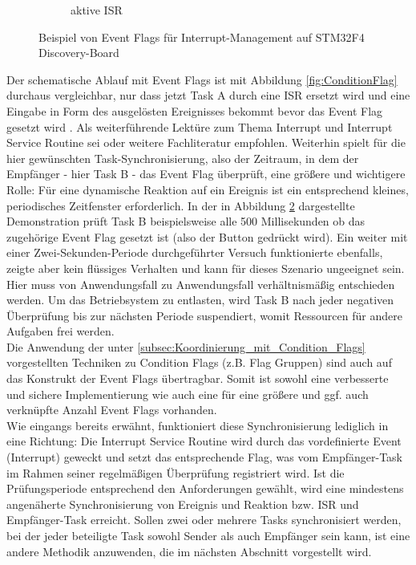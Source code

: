 \documentclass{llncs}
\begin{document}
\begin{figure}
\begin{subfigure}{.250\textwidth}
		\caption{aktive ISR}
		\label{fig:EventFlagAn}
	\end{subfigure}
	\caption{Beispiel von Event Flags für Interrupt-Management auf STM32F4 Discovery-Board}
	\label{fig:EventFlagBeispiel}
\end{figure}

Der schematische Ablauf mit Event Flags ist mit Abbildung \ref{fig:ConditionFlag} durchaus vergleichbar, nur dass jetzt Task A durch eine ISR ersetzt wird und eine Eingabe in Form des ausgelösten Ereignisses bekommt bevor das Event Flag gesetzt wird \autocite[vgl.][87]{Cooling2017}. Als weiterführende Lektüre zum Thema Interrupt und Interrupt Service Routine sei \autocite{MikrocontrollerInterrupt} oder weitere Fachliteratur empfohlen. Weiterhin spielt für die hier gewünschten Task-Synchronisierung, also der Zeitraum, in dem der Empfänger - hier Task B - das Event Flag überprüft, eine größere und wichtigere Rolle: Für eine dynamische Reaktion auf ein Ereignis ist ein entsprechend kleines, periodisches Zeitfenster erforderlich. In der in Abbildung \ref{fig:EventFlagBeispiel} dargestellte Demonstration prüft Task B beispielsweise alle 500 Millisekunden ob das zugehörige Event Flag gesetzt ist (also der Button gedrückt wird). Ein weiter mit einer Zwei-Sekunden-Periode durchgeführter Versuch funktionierte ebenfalls, zeigte aber kein flüssiges Verhalten und kann für dieses Szenario ungeeignet sein. Hier muss von Anwendungsfall zu Anwendungsfall verhältnismäßig entschieden werden. Um das Betriebsystem zu entlasten, wird Task B nach jeder negativen Überprüfung bis zur nächsten Periode suspendiert, womit Ressourcen für andere Aufgaben frei werden.\\ 

Die Anwendung der unter \ref{subsec:Koordinierung_mit_Condition_Flags} vorgestellten Techniken zu Condition Flags (z.B. Flag Gruppen) sind auch auf das Konstrukt der Event Flags übertragbar. Somit ist sowohl eine verbesserte und sichere Implementierung wie auch eine für eine größere und ggf. auch verknüpfte Anzahl Event Flags vorhanden. \autocite[vgl.][87-88]{Cooling2017}\\

Wie eingangs bereits erwähnt, funktioniert diese Synchronisierung lediglich in eine Richtung: Die Interrupt Service Routine wird durch das vordefinierte Event (Interrupt) geweckt und setzt das entsprechende Flag, was vom Empfänger-Task im Rahmen seiner regelmäßigen Überprüfung registriert wird. Ist die Prüfungsperiode entsprechend den Anforderungen gewählt, wird eine mindestens angenäherte Synchronisierung von Ereignis und Reaktion bzw. ISR und Empfänger-Task erreicht. Sollen zwei oder mehrere Tasks synchronisiert werden, bei der jeder beteiligte Task sowohl Sender als auch Empfänger sein kann, ist eine andere Methodik anzuwenden, die im nächsten Abschnitt vorgestellt wird.
\end{document}
